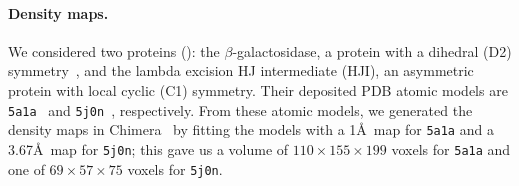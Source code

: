 \paragraph{Density maps.}
We considered two proteins (): the $\beta$-galactosidase, a protein with a dihedral (D2) symmetry~\cite{noauthor_d2sym_nodate}, and the lambda excision HJ intermediate (HJI), an asymmetric protein with local cyclic (C1) symmetry.
Their deposited PDB atomic models are \texttt{5a1a}~\cite{bartesaghi2015betagal} and \texttt{5j0n}~\cite{laxmikanthan2016structure}, respectively.
From these atomic models, we generated the density maps in Chimera~\cite{pettersen2004ucsf} by fitting the models with a 1\AA\ map for \texttt{5a1a} and a 3.67\AA\ map for \texttt{5j0n}; this gave us a volume of $110 \times 155 \times 199$ voxels for \texttt{5a1a} and one of $69 \times 57 \times 75$ voxels for \texttt{5j0n}.

